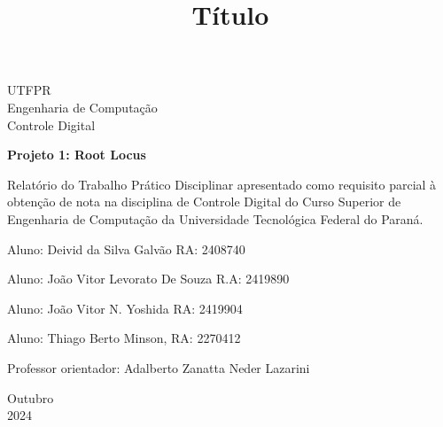 \documentclass[a4paper, 12pt]{article}
\begin{document}
\begin{titlepage}
	\begin{center}
	

		\Huge{UTFPR}\\
		\large{Engenharia de Computação}\\ 
		\large{Controle Digital}\\ 
\vspace{15pt}
        
        \vspace{85pt}
        
		\textbf{\LARGE{Projeto 1: Root Locus}}
		\title{\large{Título}}
			
	\end{center}
\vspace{1,5cm}
	
	\begin{flushright}

   \begin{list}{}{
      \setlength{\leftmargin}{4.5cm}
      \setlength{\rightmargin}{0cm}
      \setlength{\labelwidth}{0pt}
      \setlength{\labelsep}{\leftmargin}}

      \item Relatório do Trabalho Prático Disciplinar apresentado como requisito parcial à obtenção de nota na disciplina de Controle Digital do Curso Superior de Engenharia de Computação da Universidade Tecnológica Federal do Paraná.

      \begin{list}{}{
      \setlength{\leftmargin}{0cm}
      \setlength{\rightmargin}{0cm}
      \setlength{\labelwidth}{0pt}
      \setlength{\labelsep}{\leftmargin}}

                \item Aluno: Deivid da Silva Galvão RA: 2408740\\
               \item  Aluno: João Vitor Levorato De Souza
R.A: 2419890\\
                \item Aluno: João Vitor N. Yoshida RA: 2419904\\
                \item Aluno: Thiago Berto Minson, RA: 2270412\\
            \item Professor orientador:  Adalberto Zanatta Neder Lazarini \

      \end{list}
   \end{list}
\end{flushright}
\vspace{1cm}
\begin{center}
		\vspace{\fill}
		 Outubro\\
		 2024
			\end{center}
\end{titlepage}
\end{document}
